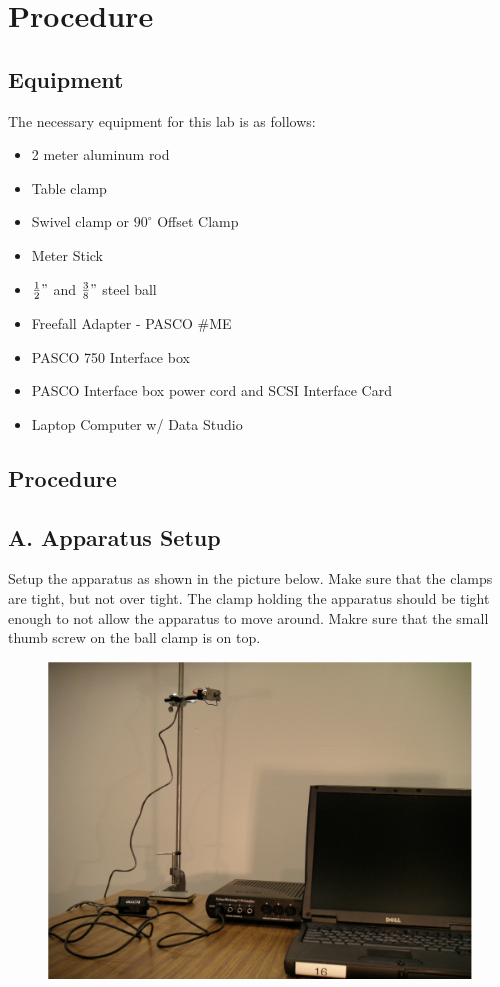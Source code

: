 \chapter{Procedure}
\section{Equipment}
The necessary equipment for this lab is as follows:
\begin{itemize}
  \item 2 meter aluminum rod
  \item Table clamp
  \item Swivel clamp or $90^\circ$ Offset Clamp
  \item Meter Stick
  \item $\frac{1}{2}"$ and $\frac{3}{8}"$ steel ball
  \item Freefall Adapter - PASCO \#ME
  \item PASCO 750 Interface box
  \item PASCO Interface box power cord and SCSI Interface Card
  \item Laptop Computer w/ Data Studio
\end{itemize}

\section{Procedure}

\section{A. Apparatus Setup}
Setup the apparatus as shown in the picture below. Make sure that the clamps are tight,
but not over tight. The clamp holding the apparatus should be tight enough to not allow
the apparatus to move around. Makre sure that the small thumb screw on the ball
clamp is on top.

\begin{figure}[htbp]
  \centerline{\includegraphics{resources/photo1.jpg}}
\end{figure}
